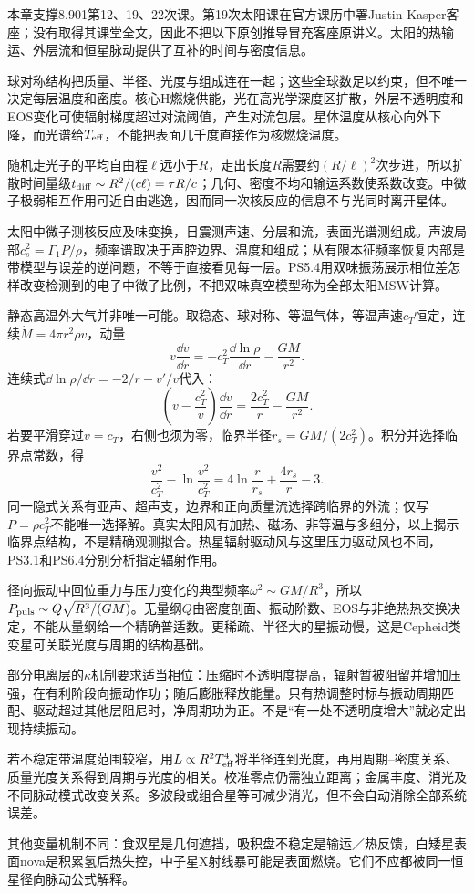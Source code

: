 本章支撑8.901第12、19、22次课。第19次太阳课在官方课历中署Justin Kasper客座；没有取得其课堂全文，因此不把以下原创推导冒充客座原讲义。太阳的热输运、外层流和恒星脉动提供了互补的时间与密度信息。

球对称结构把质量、半径、光度与组成连在一起；这些全球数足以约束，但不唯一决定每层温度和密度。核心H燃烧供能，光在高光学深度区扩散，外层不透明度和EOS变化可使辐射梯度超过对流阈值，产生对流包层。星体温度从核心向外下降，而光谱给$T_{\rm eff}$，不能把表面几千度直接作为核燃烧温度。

随机走光子的平均自由程$\ell$远小于$R$，走出长度$R$需要约$(R/\ell)^2$次步进，所以扩散时间量级$t_{\rm diff}\sim R^2/(c\ell)=\tau R/c$；几何、密度不均和输运系数使系数改变。中微子极弱相互作用可近自由逃逸，因而同一次核反应的信息不与光同时离开星体。

太阳中微子测核反应及味变换，日震测声速、分层和流，表面光谱测组成。声波局部$c_s^2=\Gamma_1P/\rho$，频率谱取决于声腔边界、温度和组成；从有限本征频率恢复内部是带模型与误差的逆问题，不等于直接看见每一层。PS5.4用双味振荡展示相位差怎样改变检测到的电子中微子比例，不把双味真空模型称为全部太阳MSW计算。

静态高温外大气并非唯一可能。取稳态、球对称、等温气体，等温声速$c_T$恒定，连续$\dot M=4\pi r^2\rho v$，动量
\[
 v\frac{\dd v}{\dd r}=-c_T^2\frac{\dd\ln\rho}{\dd r}-\frac{GM}{r^2}.
\]
连续式$\dd\ln\rho/\dd r=-2/r-v'/v$代入：
\[
 \left(v-\frac{c_T^2}{v}\right)\frac{\dd v}{\dd r}
 =\frac{2c_T^2}{r}-\frac{GM}{r^2}.
\]
若要平滑穿过$v=c_T$，右侧也须为零，临界半径$r_s=GM/(2c_T^2)$。积分并选择临界点常数，得
\[
 \frac{v^2}{c_T^2}-\ln\frac{v^2}{c_T^2}
 =4\ln\frac r{r_s}+\frac{4r_s}{r}-3 .
\]
同一隐式关系有亚声、超声支，边界和正向质量流选择跨临界的外流；仅写$P=\rho c_T^2$不能唯一选择解。真实太阳风有加热、磁场、非等温与多组分，以上揭示临界点结构，不是精确观测拟合。热星辐射驱动风与这里压力驱动风也不同，PS3.1和PS6.4分别分析指定辐射作用。

径向振动中回位重力与压力变化的典型频率$\omega^2\sim GM/R^3$，所以$P_{\rm puls}\sim Q\sqrt{R^3/(GM)}$。无量纲$Q$由密度剖面、振动阶数、EOS与非绝热热交换决定，不能从量纲给一个精确普适数。更稀疏、半径大的星振动慢，这是Cepheid类变星可关联光度与周期的结构基础。

部分电离层的$\kappa$机制要求适当相位：压缩时不透明度提高，辐射暂被阻留并增加压强，在有利阶段向振动作功；随后膨胀释放能量。只有热调整时标与振动周期匹配、驱动超过其他层阻尼时，净周期功为正。不是“有一处不透明度增大”就必定出现持续振动。

若不稳定带温度范围较窄，用$L\propto R^2T_{\rm eff}^4$将半径连到光度，再用周期--密度关系、质量光度关系得到周期与光度的相关。校准零点仍需独立距离；金属丰度、消光及不同脉动模式改变关系。多波段或组合星等可减少消光，但不会自动消除全部系统误差。

其他变量机制不同：食双星是几何遮挡，吸积盘不稳定是输运／热反馈，白矮星表面nova是积累氢后热失控，中子星X射线暴可能是表面燃烧。它们不应都被同一恒星径向脉动公式解释。

